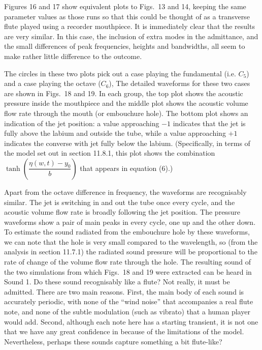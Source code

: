   Figures 16 and 17 show equivalent plots to Figs.\ 13 and 14, keeping the same 
  parameter values as those runs so that this could be thought of as a 
  transverse flute played using a recorder mouthpiece. It is immediately clear 
  that the results are very similar. In this case, the inclusion of extra modes 
  in the admittance, and the small differences of peak frequencies, heights and 
  bandwidths, all seem to make rather little difference to the outcome. 

  The circles in these two plots pick out a case playing the fundamental (i.e. 
  $C_5$) and a case playing the octave ($C_6$), The detailed waveforms for 
  these two cases are shown in Figs.\ 18 and 19. In each group, the top plot 
  shows the acoustic pressure inside the mouthpiece and the middle plot shows 
  the acoustic volume flow rate through the mouth (or embouchure hole). The 
  bottom plot shows an indication of the jet position: a value approaching $-1$ 
  indicates that the jet is fully above the labium and outside the tube, while 
  a value approaching $+1$ indicates the converse with jet fully below the 
  labium. (Specifically, in terms of the model set out in section 11.8.1, this 
  plot shows the combination $\tanh \left( \dfrac{\eta(w,t)-y_0}{b} \right)$ 
  that appears in equation (6).) 

  Apart from the octave difference in frequency, the waveforms are recognisably 
  similar. The jet is switching in and out the tube once every cycle, and the 
  acoustic volume flow rate is broadly following the jet position. The pressure 
  waveforms show a pair of main peaks in every cycle, one up and the other 
  down. To estimate the sound radiated from the embouchure hole by these 
  waveforms, we can note that the hole is very small compared to the 
  wavelength, so (from the analysis in section 11.7.1) the radiated sound 
  pressure will be proportional to the rate of change of the volume flow rate 
  through the hole. The resulting sound of the two simulations from which 
  Figs.\ 18 and 19 were extracted can be heard in Sound 1. Do these sound 
  recognisably like a flute? Not really, it must be admitted. There are two 
  main reasons. First, the main body of each sound is accurately periodic, with 
  none of the “wind noise” that accompanies a real flute note, and none of the 
  subtle modulation (such as vibrato) that a human player would add. Second, 
  although each note here has a starting transient, it is not one that we have 
  any great confidence in because of the limitations of the model. 
  Nevertheless, perhaps these sounds capture something a bit flute-like? 

